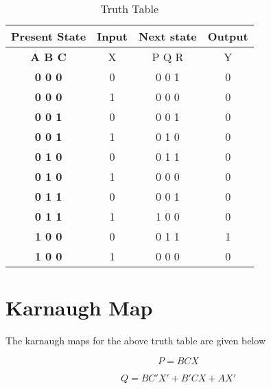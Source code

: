 \documentclass{article}
\begin{document}
  \vspace{5mm}
  \begin{table}[h]
  \centering
  \begin{tabular}{|c|c|c|c|}
  \hline
   
   \textbf{Present State}&{Input}&{Next state}&{Output}\\
   \hline
   \textbf{A B C}&{X}&{P Q R}&{Y}\\
   \hline	  
   \textbf{0 0 0}&{0}&{0 0 1}&{0}\\
   \textbf{0 0 0}&{1}&{0 0 0}&{0}\\
   \textbf{0 0 1}&{0}&{0 0 1}&{0}\\
   \textbf{0 0 1}&{1}&{0 1 0}&{0}\\
   \textbf{0 1 0}&{0}&{0 1 1}&{0}\\
   \textbf{0 1 0}&{1}&{0 0 0}&{0}\\
   \textbf{0 1 1}&{0}&{0 0 1}&{0}\\
   \textbf{0 1 1}&{1}&{1 0 0}&{0}\\
   \textbf{1 0 0}&{0}&{0 1 1}&{1}\\
   \textbf{1 0 0}&{1}&{0 0 0}&{0}\\
  \hline
  \end{tabular}
  \vspace{5mm}
  \caption{Truth Table}
  \label{Table:2}
  \end{table}

\newpage
\section{Karnaugh Map}
  The karnaugh maps for the above truth table are given below

 \vspace{5mm}

\begin{karnaugh-map}[4][4][1][$CX$][$AB$]
	\autoterms[$X$]

    \end{karnaugh-map}
    \newline                                         
    \begin{equation}                                   P=BCX      
    \label{eq1}                
    \end{equation}

    \begin{karnaugh-map}[4][4][1][$CX$][$AB$]  
	     \autoterms[$X$]
	    
	    \end{karnaugh-map}   
	    \newline  
	    \begin{equation}   
	    Q = BC'X'+B'CX+AX'     
	      \label{eq2}   
	    \end{equation}
\end{document}

